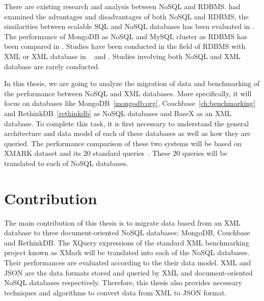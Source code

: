 	\par		
	There are existing research and analysis between NoSQL and RDBMS. \citet{nance2013nosql} had examined the advantages and disadvantages of both NoSQL and RDBMS, the similarities between scalable SQL and NoSQL databases has been evaluated in \cite{cattell2011scalable}. The performance of MongoDB as NoSQL and MySQL cluster as  RDBMS has been compared in   \cite{hadjigeorgiou2013rdbms}.   Studies have been conducted in the field of RDBMS with XML or XML database in  ~\cite{jiang2002xparent} and \cite{shanmugasundaram1999relational}. Studies involving both NoSQL and XML database are rarely conducted.
\par
In this thesis, we are going to analyze the migration of data and benchmarking of the performance between NoSQL and XML databases. More specifically, it will focus on databases like MongoDB~\ref{mongodb:org}, Couchbase~\ref{ch:benchmarking} and RethinkDB~\ref{rethinkdb} as NoSQL databases and BaseX as an XML database. To complete this task, it is first necessary to understand the general architecture and data model of each of these databases as well as how they are queried. The performance comparison of these two systems will be based on XMARK dataset and its 20 standard queries~\citep{xmark/original}. These 20 queries will be translated to each of NoSQL databases.
	
	\section{Contribution}
		The main contribution of this thesis is to migrate data based from an XML database to three document-oriented NoSQL databases: MongoDB, Couchbase and RethinkDB. The XQuery expressions of the standard XML benchmarking project known as XMark will be  translated  into each of the NoSQL databases. Their performances are  evaluated according to the their data model. XML and JSON are the data formats stored and queried by XML and document-oriented NoSQL databases respectively. Therefore, this thesis also provides necessary techniques and algorithms to convert data from XML to JSON format.
	    
		
